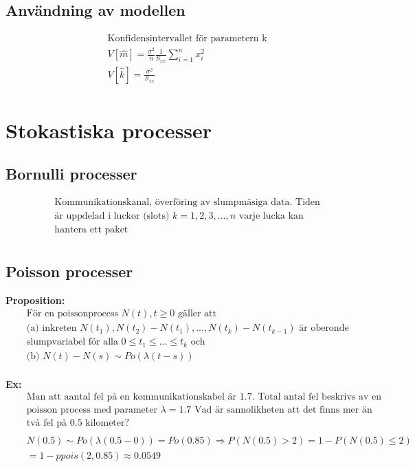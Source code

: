 \subsection{Användning av modellen}
\begin{align*}
  &\quad  \text{Konfidensintervallet för parametern k} \\
  &\quad  V[\hat{m}]=\frac{\sigma^2}{n}\frac{1}{S_{xx}} \sum_{i=1}^{n}x^2_i \\
  &\quad  V[\hat{k}]=\frac{\sigma^2}{S_{xx}} \\
\end{align*}

\section{Stokastiska processer}
\subsection{Bornulli processer}
\begin{align*}
  &\quad  \text{Kommunikationskanal, överföring av slumpmäsiga data. Tiden} \\
  &\quad  \text{är uppdelad i luckor (slots) $k=1,2,3,...,n$ varje lucka kan} \\
  &\quad  \text{hantera ett paket} \\
\end{align*}

\subsection{Poisson processer}
\textbf{Proposition:}
\begin{align*}
  &\quad  \text{För en poissonprocess $N(t), t \geq 0$ gäller att } \\
  &\quad  \text{(a) inkreten $N(t_1),N(t_2)-N(t_1),...,N(t_k)-N(t_{k-1})$ är oberonde} \\
  &\quad  \text{slumpvariabel för alla $0\leq t_1 \leq ... \leq t_k$ och } \\
  &\quad  \text{(b) } N(t) - N(s) \sim Po(\lambda(t-s)) \\
\end{align*}

\textbf{Ex:}
\begin{align*}
  &\quad  \text{Man att aantal fel på en kommunikationskabel är $1.7$. Total antal fel beskrivs av en} \\
  &\quad  \text{poisson process med parameter $\lambda=1.7$ Vad är sannolikheten att det finns mer än } \\
  &\quad  \text{två fel på $0.5$ kilometer?} \\
  &\quad  \\
  &\quad  N(0.5)\sim Po(\lambda(0.5-0))=Po(0.85) \Rightarrow P(N(0.5)>2) = 1-P(N(0.5)\leq2) \\
  &\quad  = 1-ppois(2, 0.85) \approx 0.0549 \\
\end{align*}

